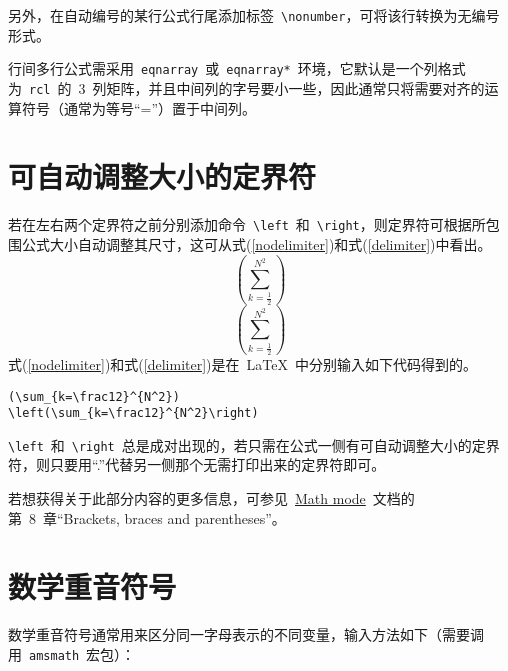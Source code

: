 另外，在自动编号的某行公式行尾添加标签~\verb|\nonumber|，可将该行转换为无编号形式。

行间多行公式需采用~\verb|eqnarray|~或~\verb|eqnarray*|~环境，它默认是一个列格式为~\verb|rcl|~的~3~列矩阵，并且中间列的字号要小一些，因此通常只将需要对齐的运算符号（通常为等号“=”）置于中间列。

\section{可自动调整大小的定界符}
若在左右两个定界符之前分别添加命令~\verb|\left|~和~\verb|\right|，则定界符可根据所包围公式大小自动调整其尺寸，这可从式(\ref{nodelimiter})和式(\ref{delimiter})中看出。
\begin{equation}\label{nodelimiter}
(\sum_{k=\frac12}^{N^2})
\end{equation}
\begin{equation}\label{delimiter}
\left(\sum_{k=\frac12}^{N^2}\right)
\end{equation}
式(\ref{nodelimiter})和式(\ref{delimiter})是在~\LaTeX~中分别输入如下代码得到的。
\begin{verbatim}
(\sum_{k=\frac12}^{N^2})
\left(\sum_{k=\frac12}^{N^2}\right)
\end{verbatim}
\verb|\left|~和~\verb|\right|~总是成对出现的，若只需在公式一侧有可自动调整大小的定界符，则只要用“.”代替另一侧那个无需打印出来的定界符即可。

若想获得关于此部分内容的更多信息，可参见~\href{http://tug.ctan.org/cgi-bin/ctanPackageInformation.py?id=voss-mathmode}{Math mode}~文档的第~8~章“Brackets, braces and parentheses”。

\section{数学重音符号}
数学重音符号通常用来区分同一字母表示的不同变量，输入方法如下（需要调用~\verb|amsmath|~宏包）：

